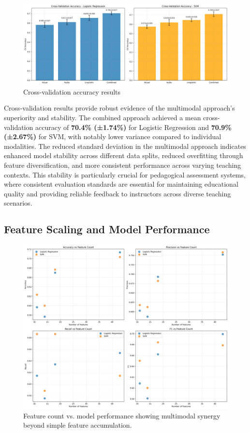 \begin{figure}[H]
    \centering
    \includegraphics[width=\textwidth]{sections/cross_validation_comparison.jpg}
    \caption{Cross-validation accuracy results}
    \label{fig:cross_validation}
\end{figure}

Cross-validation results provide robust evidence of the multimodal approach's superiority and stability. The combined approach achieved a mean cross-validation accuracy of \textbf{70.4\% (±1.74\%)} for Logistic Regression and \textbf{70.9\% (±2.67\%)} for SVM, with notably lower variance compared to individual modalities. The reduced standard deviation in the multimodal approach indicates enhanced model stability across different data splits, reduced overfitting through feature diversification, and more consistent performance across varying teaching contexts. This stability is particularly crucial for pedagogical assessment systems, where consistent evaluation standards are essential for maintaining educational quality and providing reliable feedback to instructors across diverse teaching scenarios.

\subsection{Feature Scaling and Model Performance}

\begin{figure}[H]
    \centering
    \includegraphics[width=\textwidth]{sections/feature_count_vs_performance.jpg}
    \caption{Feature count vs. model performance showing multimodal synergy beyond simple feature accumulation.}
    \label{fig:feature_scaling}
\end{figure}

